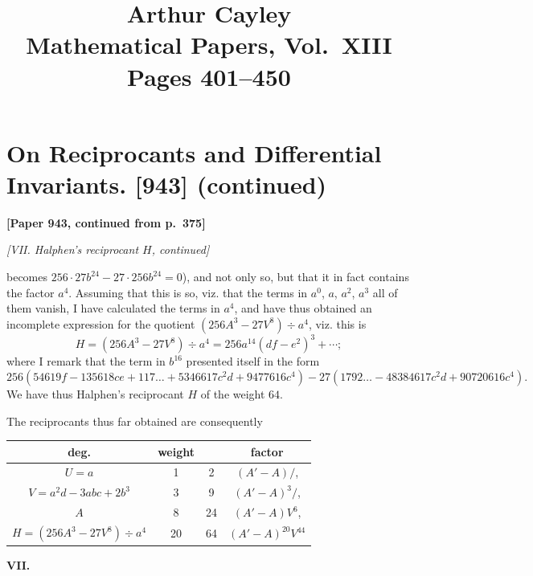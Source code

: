 \documentclass[12pt,a4paper]{article}
\title{\textbf{Arthur Cayley}\\[6pt]
\Large Mathematical Papers, Vol.~XIII\\[4pt]
\large Pages 401--450}
\author{}
\date{}
\theoremstyle{plain}
\begin{document}
\maketitle
\thispagestyle{empty}

\tableofcontents
\newpage

\section[On Reciprocants and Differential Invariants (continued)]
{On Reciprocants and Differential Invariants. [943] (continued)}

\noindent\textbf{[Paper 943, continued from p.~375]}

\bigskip

\noindent\textit{[VII. Halphen's reciprocant $H$, continued]}

\medskip

becomes $256 \cdot 27b^{24} - 27 \cdot 256b^{24} = 0$), and not only so, but that it in fact contains the factor $a^4$. Assuming that this is so, viz.
that the terms in $a^0$, $a$, $a^2$, $a^3$ all of them vanish, I have calculated the terms in $a^4$, and have thus obtained an incomplete expression for the quotient $(256A^3 - 27V^8) \div a^4$, viz.
this is
\[
H = (256A^3 - 27V^8) \div a^4 = 256a^{14}(df - e^2)^3 + \cdots ;
\]
where I remark that the term in $b^{16}$ presented itself in the form
\[
256(54619f - 135618ce + 117\dots + 5346617c^2d + 9477616c^4) - 27(1792\dots - 48384617c^2d + 90720616c^4).
\]
We have thus Halphen's reciprocant $H$ of the weight $64$.

The reciprocants thus far obtained are consequently
\begin{center}
\begin{tabular}{c|c|c|c}
deg. & weight & & factor \\ \hline
$U = a$ & 1 & 2 & $(A' - A)/$, \\
$V = a^2d - 3abc + 2b^3$ & 3 & 9 & $(A' - A)^3/$, \\
$A$ & 8 & 24 & $(A' - A)V^6$, \\
$H = (256A^3 - 27V^8) \div a^4$ & 20 & 64 & $(A' - A)^{20}V^{44}$
\end{tabular}
\end{center}

\medskip

\noindent\textbf{VII.}
\end{document}
